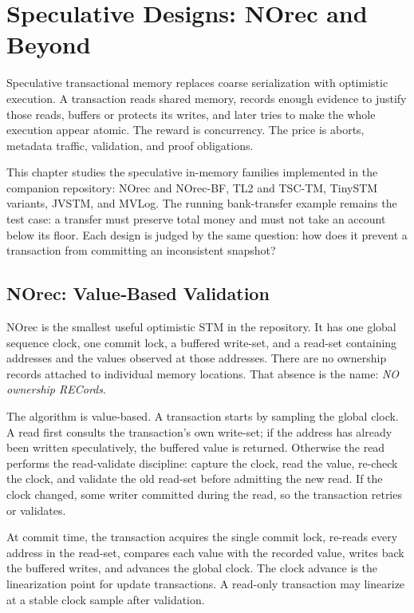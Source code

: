 \chapter{Speculative Designs: NOrec and Beyond}

Speculative transactional memory replaces coarse serialization with optimistic execution. A transaction reads shared memory, records enough evidence to justify those reads, buffers or protects its writes, and later tries to make the whole execution appear atomic. The reward is concurrency. The price is aborts, metadata traffic, validation, and proof obligations.

This chapter studies the speculative in-memory families implemented in the companion repository: NOrec and NOrec-BF, TL2 and TSC-TM, TinySTM variants, JVSTM, and MVLog. The running bank-transfer example remains the test case: a transfer must preserve total money and must not take an account below its floor. Each design is judged by the same question: how does it prevent a transaction from committing an inconsistent snapshot?

\section{NOrec: Value‑Based Validation}

NOrec is the smallest useful optimistic STM in the repository. It has one global sequence clock, one commit lock, a buffered write-set, and a read-set containing addresses and the values observed at those addresses. There are no ownership records attached to individual memory locations. That absence is the name: \emph{NO ownership RECords}.

The algorithm is value-based. A transaction starts by sampling the global clock. A read first consults the transaction's own write-set; if the address has already been written speculatively, the buffered value is returned. Otherwise the read performs the read-validate discipline: capture the clock, read the value, re-check the clock, and validate the old read-set before admitting the new read. If the clock changed, some writer committed during the read, so the transaction retries or validates.

At commit time, the transaction acquires the single commit lock, re-reads every address in the read-set, compares each value with the recorded value, writes back the buffered writes, and advances the global clock. The clock advance is the linearization point for update transactions. A read-only transaction may linearize at a stable clock sample after validation.

